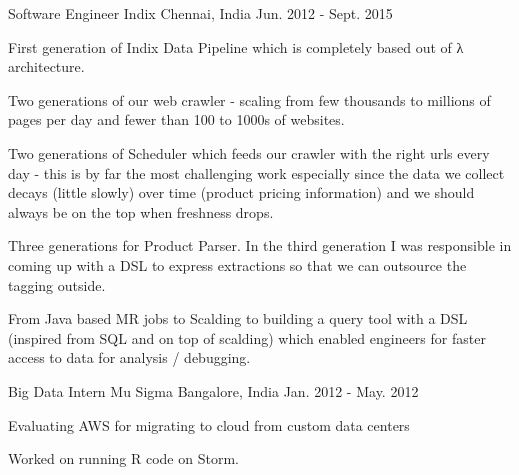 \begin{cventries}
  \cventry
    {Software Engineer} %
    {Indix} %
    {Chennai, India} %
    {Jun. 2012 - Sept. 2015} %
    {
      \begin{cvitems} %
        \item {First generation of Indix Data Pipeline which is completely based out of λ architecture. }
        \item {Two generations of our web crawler - scaling from few thousands to millions of pages per day and fewer than 100 to 1000s of websites. }
        \item {Two generations of Scheduler which feeds our crawler with the right urls every day - this is by far the most challenging work especially since the data we collect decays (little slowly) over time (product pricing information) and
        we should always be on the top when freshness drops. }
        \item {Three generations for Product Parser. In the third generation I was responsible in coming up with a DSL to express extractions so that we can outsource the tagging outside.}
        \item {From Java based MR jobs to Scalding to building a query tool with a DSL (inspired from SQL and on top of scalding) which enabled engineers for faster access to data for analysis / debugging.}
      \end{cvitems}
    }

  \cventry
    {Big Data Intern} %
    {Mu Sigma} %
    {Bangalore, India} %
    {Jan. 2012 - May. 2012} %
    {
      \begin{cvitems} %
        \item {Evaluating AWS for migrating to cloud from custom data centers}
        \item {Worked on running R code on Storm.}
      \end{cvitems}
    }

\end{cventries}
